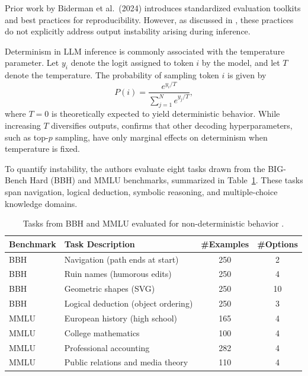 Prior work by Biderman et al.\ (2024) introduces standardized evaluation toolkits and best practices for reproducibility.
However, as discussed in \cite{nondeterminism_llm_settings}, these practices do not explicitly address output instability arising during inference.

Determinism in LLM inference is commonly associated with the temperature parameter.
Let $y_i$ denote the logit assigned to token $i$ by the model, and let $T$ denote the temperature.
The probability of sampling token $i$ is given by
\begin{equation}
P(i) = \frac{e^{y_i / T}}{\sum_{j=1}^{N} e^{y_j / T}} ,
\label{eq:softmax_temperature-original}
\end{equation}
where $T=0$ is theoretically expected to yield deterministic behavior.
While increasing $T$ diversifies outputs, \cite{nondeterminism_llm_settings} confirms that other decoding hyperparameters, such as top-$p$ sampling, have only marginal effects on determinism when temperature is fixed.

To quantify instability, the authors evaluate eight tasks drawn from the BIG-Bench Hard (BBH) and MMLU benchmarks, summarized in Table~\ref{tab:tasks_bbh_mmlu-original}.
These tasks span navigation, logical deduction, symbolic reasoning, and multiple-choice knowledge domains.

\begin{table}[h]
\centering
\small
\begin{tabular}{l l c c}
\hline
\textbf{Benchmark} & \textbf{Task Description} & \textbf{\#Examples} & \textbf{\#Options} \\
\hline
BBH & Navigation (path ends at start) & 250 & 2 \\
BBH & Ruin names (humorous edits) & 250 & 4 \\
BBH & Geometric shapes (SVG) & 250 & 10 \\
BBH & Logical deduction (object ordering) & 250 & 3 \\
MMLU & European history (high school) & 165 & 4 \\
MMLU & College mathematics & 100 & 4 \\
MMLU & Professional accounting & 282 & 4 \\
MMLU & Public relations and media theory & 110 & 4 \\
\hline
\end{tabular}
\caption{Tasks from BBH and MMLU evaluated for non-deterministic behavior \cite{nondeterminism_llm_settings}.}
\label{tab:tasks_bbh_mmlu-original}
\end{table}

